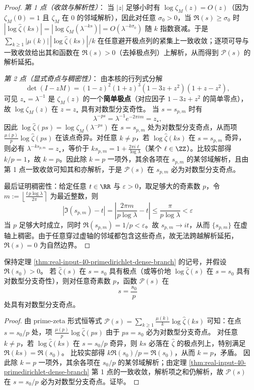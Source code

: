 \begin{proof}
\emph{第 1 点（收敛与解析性）}：
当 $|z|$ 足够小时有 $\log\zeta_M(z)=O(z)$（因为 $\zeta_M(0)=1$ 且 $\zeta_M$ 在 $0$ 的邻域解析），因此对任意 $\sigma_0>0$，当 $\Re(s)\ge \sigma_0$ 时
\(
|\log\widehat{\zeta}(ks)|=|\log\zeta_M(\lambda^{-ks})|=O(\lambda^{-k\sigma_0})
\)
随 $k$ 指数衰减。于是 $\sum_{k\ge 1}|\mu(k)|\,|\log\widehat{\zeta}(ks)|/k$ 在任意避开极点列的紧集上一致收敛；逐项可导与一致收敛给出其和函数在 $\Re(s)>0$（去掉极点列）上解析，从而得到 $\mathcal{P}(s)$ 的解析延拓。

\emph{第 2 点（显式奇点与稠密性）}：
由本核的行列式分解
\[
\det(I-zM)=(1-z)^2(1+z)^3(1-3z+z^2)(1+z-z^2),
\]
可见 $z_\star=\lambda^{-1}$ 是 $\zeta_M(z)$ 的一个\textbf{简单极点}（对应因子 $1-3z+z^2$ 的简单零点），故 $\log\zeta_M(z)$ 在 $z=z_\star$ 具有对数型分支奇性。
当 $s=s_{p,m}$ 时有
\[
\lambda^{-ps}=\lambda^{-1}e^{-2\pi i m}=z_\star,
\]
因此 $\log\widehat{\zeta}(ps)=\log\zeta_M(\lambda^{-ps})$ 在 $s=s_{p,m}$ 处为对数型分支奇点，从而项
\(
\frac{\mu(p)}{p}\log\widehat{\zeta}(ps)
\)
在该点奇异。对任意 $k\neq p$，若 $\log\widehat{\zeta}(ks)$ 在 $s=s_{p,m}$ 奇异，则必有 $\lambda^{-ks_{p,m}}=z_\star$，等价于 $ks_{p,m}=1+\frac{2\pi i \ell}{\log\lambda}$（某个 $\ell\in\ZZ$）。比较实部得 $k/p=1$，故 $k=p$。因此除 $k=p$ 一项外，其余各项在 $s_{p,m}$ 的某邻域解析，且由第 1 点一致收敛可知其和亦解析，于是 $\mathcal{P}(s)$ 在 $s_{p,m}$ 必为对数型分支奇点。

最后证明稠密性：给定任意 $t\in\RR$ 与 $\varepsilon>0$，取足够大的奇素数 $p$，令
\(
m:=\left\lfloor \frac{t\,p\log\lambda}{2\pi}\right\rceil
\)
为最近整数，则
\[
\left|\Im(s_{p,m})-t\right|
=\left|\frac{2\pi m}{p\log\lambda}-t\right|
\le \frac{\pi}{p\log\lambda}<\varepsilon
\]
当 $p$ 足够大时成立，同时 $\Re(s_{p,m})=1/p<\varepsilon$。故 $s_{p,m}\to it$，从而 $\{s_{p,m}\}$ 在虚轴上稠密。由于任意穿过虚轴的邻域都包含这些奇点，故无法跨越解析延拓，\(\Re(s)=0\) 为自然边界。
\end{proof}

\begin{proposition}\label{prop:primedirichlet-branch-inherit}
保持定理 \ref{thm:real-input-40-primedirichlet-dense-branch} 的记号，并假设 \(\Re(s_0)>0\)。
若 \(\widehat{\zeta}(s)\) 在 \(s=s_0\) 具有极点（或等价地 \(\log\widehat{\zeta}(s)\) 在 \(s=s_0\) 具有对数型分支奇性），则对任意奇素数 \(p\)，函数 \(\mathcal{P}(s)\) 在
\[
s=\frac{s_0}{p}
\]
处具有对数型分支奇点。
\end{proposition}
\begin{proof}
由 prime-zeta 形式恒等式
\(
\mathcal{P}(s)=\sum_{k\ge 1}\frac{\mu(k)}{k}\log\widehat{\zeta}(ks)
\)
可知：在点 \(s=s_0/p\) 处，项 \(\frac{\mu(p)}{p}\log\widehat{\zeta}(ps)\) 由于 \(ps=s_0\) 必为对数型分支奇点。
对任意 \(k\neq p\)，若 \(\log\widehat{\zeta}(ks)\) 在 \(s=s_0/p\) 奇异，则 \(ks\) 必落在 \(\widehat{\zeta}\) 的极点列上，特别满足 \(\Re(ks)=\Re(s_0)\)。
比较实部得 \(k\Re(s_0)/p=\Re(s_0)\)，从而 \(k=p\)，矛盾。
因此除 \(k=p\) 一项外，其余各项在 \(s_0/p\) 的某邻域解析；由定理 \ref{thm:real-input-40-primedirichlet-dense-branch} 第 1 点的一致收敛，解析项之和仍解析，故 \(\mathcal{P}(s)\) 在 \(s=s_0/p\) 必为对数型分支奇点。证毕。
\end{proof}

